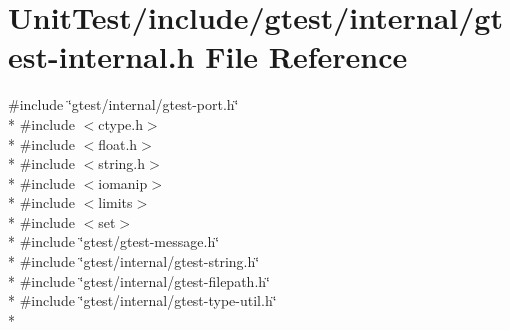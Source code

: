 \hypertarget{gtest-internal_8h}{\section{Unit\+Test/include/gtest/internal/gtest-\/internal.h File Reference}
\label{gtest-internal_8h}
}
{\ttfamily \#include \char`\"{}gtest/internal/gtest-\/port.\+h\char`\"{}}\\*
{\ttfamily \#include $<$ctype.\+h$>$}\\*
{\ttfamily \#include $<$float.\+h$>$}\\*
{\ttfamily \#include $<$string.\+h$>$}\\*
{\ttfamily \#include $<$iomanip$>$}\\*
{\ttfamily \#include $<$limits$>$}\\*
{\ttfamily \#include $<$set$>$}\\*
{\ttfamily \#include \char`\"{}gtest/gtest-\/message.\+h\char`\"{}}\\*
{\ttfamily \#include \char`\"{}gtest/internal/gtest-\/string.\+h\char`\"{}}\\*
{\ttfamily \#include \char`\"{}gtest/internal/gtest-\/filepath.\+h\char`\"{}}\\*
{\ttfamily \#include \char`\"{}gtest/internal/gtest-\/type-\/util.\+h\char`\"{}}\\*

